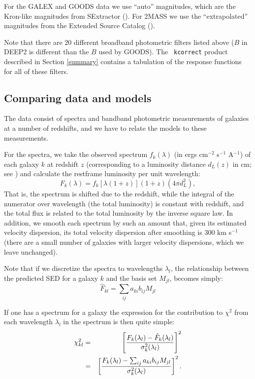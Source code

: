 \documentclass[10pt,preprint]{aastex}
\renewcommand{\AA}{A}
\begin{document}
For the GALEX and GOODS data we use ``auto'' magnitudes, which are the
Kron-like magnitudes from SExtractor (\citealt{bertin96a}).  For 2MASS
we use the ``extrapolated'' magnitudes from the Extended Source
Catalog (\citealt{jarrett00a}).

Note that there are 20 different broadband photometric filters listed
above ($B$ in DEEP2 is different than the $B$ used by GOODS). The {\tt
kcorrect} product described in Section \ref{summary} contains a
tabulation of the response functions for all of these filters.

\subsection{Comparing data and models}
\label{setupnmf}

The data consist of spectra and bandband photometric measurements of
galaxies at a number of redshifts, and we have to relate the models to
these measurements.

For the spectra, we take the observed spectrum
$f_{k}(\lambda)$ (in ergs cm$^{-2}$ s$^{-1}$ \AA$^{-1}$) of
each galaxy $k$ at redshift $z$ (corresponding to a luminosity
distance $d_L(z)$ in cm; see \citealt{hogg99a}) and calculate the
restframe luminosity per unit wavelength:
\begin{equation}
{{F}}_{k}(\lambda) = 
{{f}}_{k}[\lambda (1+z)](1+z) (4 \pi d_L^2),
\end{equation}
That is, the spectrum is shifted due to the redshift, while the
integral of the numerator over wavelength (the total luminosity) is
constant with redshift, and the total flux is related to the total
luminosity by the inverse square law.  In addition, we smooth each
spectrum by such an amount that, given its estimated velocity
dispersion, its total velocity dispersion after smoothing is 300 km
s$^{-1}$ (there are a small number of galaxies with larger velocity
dispersions, which we leave unchanged).

Note that if we discretize the spectra to wavelengths $\lambda_l$, the
relationship between the predicted SED for a galaxy $k$ and the basis
set $M_{jl}$, becomes simply:
\begin{equation}
\hat{F}_{kl} = \sum_{ij} a_{ki} b_{ij} M_{jl}
\end{equation}

If one has a spectrum for a galaxy the
expression for the contribution to $\chi^2$ from each wavelength
$\lambda_l$ in the spectrum is then quite simple:
\begin{eqnarray}
\label{chi2spec}
\chi_{kl}^2 &=& \left[\frac{F_{k}(\lambda_l) -
{\hat{F}}_{k}(\lambda_l)} 
{\sigma^2_k(\lambda_l)}\right]^2 \cr
&=&
\left[\frac{F_{k}(\lambda_l) -
\sum_{ij} a_{ki} b_{ij} M_{jl}
}{\sigma^2_k(\lambda_l)}\right]^2. 
\end{eqnarray}
\end{document}
